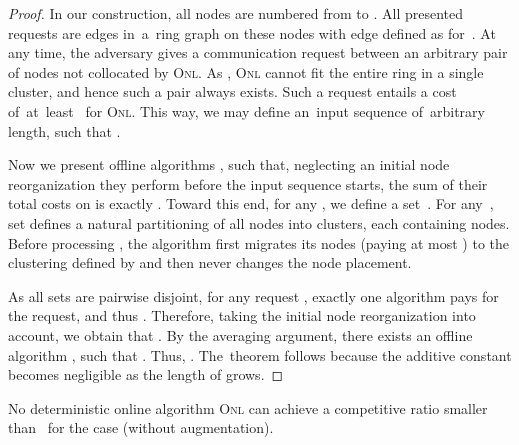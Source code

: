 \documentclass{siamart190516}
\newcommand{\ONL}{\textsc{Onl}\xspace}
\begin{document}
\begin{proof}
In our construction, all nodes are numbered from  to . All
presented requests are edges in~a~ring graph on these nodes with edge 
defined as  for~. At any time,
the adversary gives a communication request between an arbitrary pair of nodes
not collocated by \ONL. As , \ONL cannot fit the entire ring in
a single cluster, and hence such a pair always exists. Such a request
entails a cost of~at~least~ for \ONL. This way, we may define an~input
sequence  of~arbitrary length, such that .

Now we present  offline algorithms , such
that, neglecting an initial node reorganization they perform before
the input sequence starts, the sum of their total costs on  is exactly
. Toward this end, for any , we define a
set~. For any~, set  defines a
natural partitioning of all nodes into clusters, each containing  nodes.
Before processing , the algorithm  first migrates its nodes
(paying at most ) to the clustering defined by  and
then never changes the node placement.

As all sets  are pairwise disjoint, for any request ,
exactly one algorithm  pays for the request, and thus . Therefore, taking the initial node reorganization into
account, we obtain that . By the averaging argument, there exists an offline
algorithm , such that .
Thus, .
The~theorem follows because the additive constant 
becomes negligible as the length of  grows.
\end{proof}


\begin{theorem}
No deterministic online algorithm \ONL can achieve a competitive ratio 
smaller than~ for the case  (without augmentation).
\end{theorem}
\end{document}
